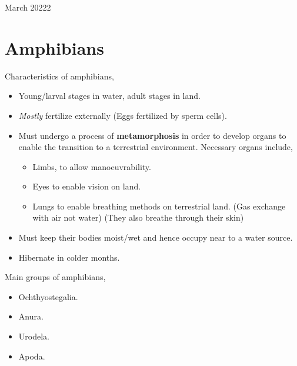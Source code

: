 \documentclass[12pt,oneside]{book} %
\begin{document}
\begin{lec}{March 20222}
  \newpage

  \section{Amphibians}
  Characteristics of amphibians,
  \begin{itemize}
    \item Young/larval stages in water, adult stages in land.
    \item \textit{Mostly} fertilize externally (Eggs fertilized by sperm cells).
    \item Must undergo a process of \textbf{metamorphosis} in order to develop organs to enable the transition to a
    terrestrial environment. Necessary organs include,
    \begin{itemize}
      \item Limbs, to allow manoeuvrability.
      \item Eyes to enable vision on land.
      \item Lungs to enable breathing methods on terrestrial land. (Gas exchange with air not water) (They also breathe
      through their skin)
    \end{itemize}
      \item Must keep their bodies moist/wet and hence occupy near to a water source.
      \item Hibernate in colder months.
  \end{itemize}

  Main groups of amphibians,
  \begin{itemize}
    \item Ochthyostegalia.
    \item Anura.
    \item Urodela.
    \item Apoda.
  \end{itemize}













  




  





  

  
  



  


  



  

  

  





  




















	\end{lec}
\end{document}
